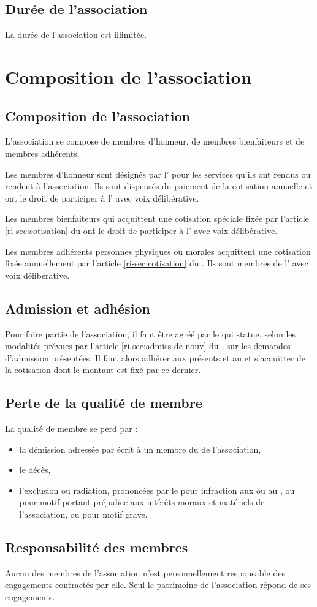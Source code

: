 \documentclass[a4paper,french,10pt]{article}
\newcommand{\article}[1]{\subsection{#1}\addtocounter{article}{1}}
\newcounter{article}
\newcommand{\artrefri}[1]{article \ref{ri-#1} du \RI{}}
\begin{document}
\article{Durée de l’association}
\label{sec:duree}
La durée de l’association est illimitée.

\section{Composition de l’association}

\article{Composition de l’association}
\label{sec:composition}
L’association se compose de membres d'honneur, de membres bienfaiteurs
et de membres adhérents.

Les membres d'honneur sont désignés par l'\AG{} pour les
services qu'ils ont rendus ou rendent à l'association. Ils sont
dispensés du paiement de la cotisation annuelle et ont le droit de
participer à l'\AG{} avec voix délibérative.

Les membres bienfaiteurs qui acquittent une cotisation spéciale fixée
par l'\artrefri{sec:cotisation} ont le droit de participer à l'\AG{} avec voix délibérative.

Les membres adhérents personnes physiques ou morales acquittent une
cotisation fixée annuellement par l'\artrefri{sec:cotisation}. Ils sont
membres de l'\AG{} avec voix délibérative.

\article{Admission et adhésion}
\label{sec:admission}
Pour faire partie de l’association, il faut être agréé par le
\bureau{} qui statue, selon les modalités prévues par
l'\artrefri{sec:admiss-de-nouv}, sur les demandes d'admission
présentées. Il faut alors adhérer aux présents \statuts{} et au \RI{}
et s’acquitter de la cotisation dont le montant est fixé par ce
dernier.

\article{Perte de la qualité de membre}
\label{sec:perte}
La qualité de membre se perd par :
\begin{itemize}
\item la démission adressée par écrit à un membre du \bureau{} de l'association,

\item le décès,

\item l'exclusion ou radiation, prononcées par le \bureau{} pour infraction
aux \statuts{} ou au \RI{}, ou pour motif portant préjudice
aux intérêts moraux et matériels de l'association, ou pour motif
grave.
\end{itemize}


\article{Responsabilité des membres}
\label{sec:responsabilite}
Aucun des membres de l’association n’est personnellement responsable
des engagements contractés par elle. Seul le patrimoine de
l’association répond de ses engagements.
\end{document}
